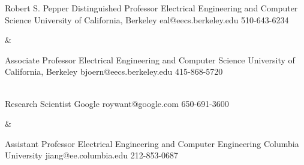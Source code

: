 
\begin{cvreferences}
  {Robert S. Pepper Distinguished Professor}
  {Electrical Engineering and Computer Science}
  {University of California, Berkeley}
  {eal@eecs.berkeley.edu}
  {510-643-6234}

  &

  {Associate Professor}
  {Electrical Engineering and Computer Science}
  {University of California, Berkeley}
  {bjoern@eecs.berkeley.edu}
  {415-868-5720}

  \\

  {Research Scientist}
  {}
  {Google}
  {roywant@google.com}
  {650-691-3600}

  &

  {Assistant Professor}
  {Electrical Engineering and Computer Engineering}
  {Columbia University}
  {jiang@ee.columbia.edu}
  {212-853-0687}

  \\



  \\
\end{cvreferences}

